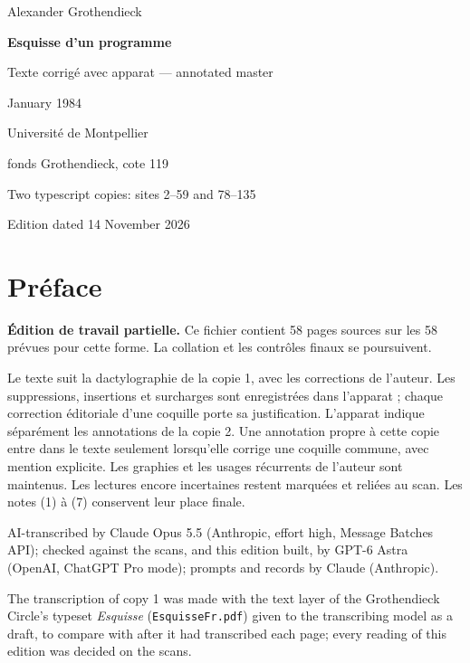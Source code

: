 \documentclass[11pt,a4paper]{article}
\newcommand{\EditionTitle}{Esquisse d'un programme}
\newcommand{\EditionForm}{Texte corrigé avec apparat — annotated master}
\begin{document}
\begin{titlepage}
\centering
\vspace*{18mm}
{\Large Alexander Grothendieck\par}
\vspace{12mm}
{\Huge\bfseries\EditionTitle\par}
\vspace{8mm}
{\Large\EditionForm\par}
\vspace{14mm}
{\large January 1984\par}
\vfill
{\large Université de Montpellier\par fonds Grothendieck, cote 119\par}
\vspace{8mm}
{\normalsize Two typescript copies: sites 2--59 and 78--135\par}
\vspace{8mm}
{\normalsize Edition dated 14 November 2026\par}
\end{titlepage}
\thispagestyle{plain}
\section*{Préface}
\noindent\textbf{Édition de travail partielle.} Ce fichier contient 58 pages sources sur les 58 prévues pour cette forme. La collation et les contrôles finaux se poursuivent.\par\smallskip
Le texte suit la dactylographie de la copie 1, avec les corrections de l’auteur. Les suppressions, insertions et surcharges sont enregistrées dans l’apparat ; chaque correction éditoriale d’une coquille porte sa justification. L’apparat indique séparément les annotations de la copie 2. Une annotation propre à cette copie entre dans le texte seulement lorsqu’elle corrige une coquille commune, avec mention explicite. Les graphies et les usages récurrents de l’auteur sont maintenus. Les lectures encore incertaines restent marquées et reliées au scan. Les notes (1) à (7) conservent leur place finale.

\smallskip
AI-transcribed by Claude Opus 5.5 (Anthropic, effort high, Message Batches API); checked against the scans, and this edition built, by GPT-6 Astra (OpenAI, ChatGPT Pro mode); prompts and records by Claude (Anthropic).


The transcription of copy 1 was made with the text layer of the Grothendieck Circle's typeset \textit{Esquisse} (\texttt{EsquisseFr.pdf}) given to the transcribing model as a draft, to compare with after it had transcribed each page; every reading of this edition was decided on the scans.
\end{document}
